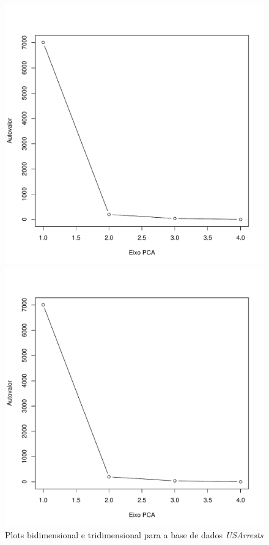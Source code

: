 \documentclass[a4paper]{article}
\begin{document}
\begin{figure}[H]
	\centering
	\begin{minipage}{.5\textwidth}
		\centering
		\includegraphics[page=2,width=\textwidth]{../usArrests.pdf}
	\end{minipage}%
	\begin{minipage}{.5\textwidth}
		\centering
		\includegraphics[page=3,width=\textwidth]{../usArrests.pdf}
	\end{minipage}
	\caption{Plots bidimensional e tridimensional para a base de dados \textit{USArrests}}
	\label{fig:usArrestsPlots}
\end{figure}
\end{document}
